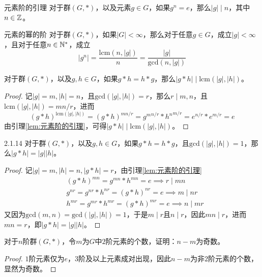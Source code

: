 \begin{lemma}{}{元素阶的引理}
	对于群$(G,*)$，以及元素$g\in G$，如果$g^n=e$，那么$|g|\mid n$，其中$n\in\mathbb{Z}$。
\end{lemma}

\begin{proposition}{}{元素的幂的阶}
	对于群$(G,*)$，如果$|G|<\infty$，那么对于任意$g\in G$，成立$|g|<\infty$，且对于任意$n\in\mathbb{N}^*$，成立
	$$
	|g^n|=\frac{\mathrm{lcm}(n,|g|)}{n}=\frac{|g|}{\mathrm{gcd}(n,|g|)}
	$$
\end{proposition}

\begin{proposition}
	对于群$(G,*)$，以及$g,h\in G$，如果$g*h=h*g$，那么$|g*h|\mid \mathrm{lcm}(|g|,|h|)$。
\end{proposition}

\begin{proof}
	记$|g|=m,|h|=n$，且$\mathrm{gcd}(|g|,|h|)=r$，那么$r\mid m,n$，且$\mathrm{lcm}(|g|,|h|)=mn/r$，进而
	$$
	(g*h)^{\mathrm{lcm}(|g|,|h|)}=(g*h)^{mn/r}={g^{m}}^{n/r}*{h^{n}}^{m/r}=e^{n/r}*e^{m/r}=e
	$$
	由引理\ref{lem:元素阶的引理}，可得$|g*h|\mid \mathrm{lcm}(|g|,|h|)$。
\end{proof}

\begin{proposition}{}{2.1.14}
	对于群$(G,*)$，以及$g,h\in G$，如果$g*h=h*g$，且$\mathrm{gcd}(|g|,|h|)=1$，那么$|g*h|=|g||h|$。
\end{proposition}

\begin{proof}
	记$|g|=m,|h|=n,|g*h|=r$，由引理\ref{lem:元素阶的引理}
	\begin{align*}
		&(g*h)^{mn}=g^{mn}*h^{mn}=e\implies r\mid mn\\
		&g^{nr}=g^{nr}*h^{nr}=(g*h)^{nr}=e\implies m\mid nr\\
		&h^{mr}=g^{mr}*h^{mr}=(g*h)^{mr}=e\implies n\mid mr
	\end{align*}
	又因为$\mathrm{gcd}(m,n)=\mathrm{gcd}(|g|,|h|)=1$，于是$m\mid r$且$n\mid r$，因此$mn\mid r$，进而$mn=r$，即$|g*h|=|g||h|$。
\end{proof}

\begin{proposition}
	对于$n$阶群$(G,*)$，令$m$为$G$中$2$阶元素的个数，证明：$n-m$为奇数。
\end{proposition}

\begin{proof}
	$1$阶元素仅为$e$，$3$阶及以上元素成对出现，因此$n-m$为非$2$阶元素的个数，显然为奇数。
\end{proof}

